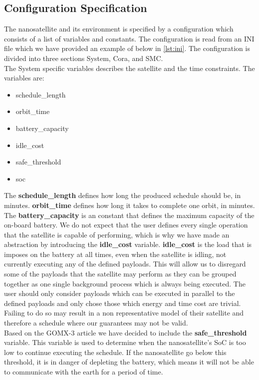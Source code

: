 \subsection{Configuration Specification} \label{subsec:init}
The nanosatellite and its environment is specified by a configuration which consists of a list of variables and constants. The configuration is read from an INI file which we have provided an example of below in \cref{lst:ini}.
The configuration is divided into three sections System, Cora, and SMC.\\
The System specific variables describes the satellite and the time constraints.
The variables are:
\begin{itemize}
	\item schedule\_length
	\item orbit\_time
	\item battery\_capacity
	\item idle\_cost
	\item safe\_threshold
	\item soc
\end{itemize}
The \textbf{schedule\_length} defines how long the produced schedule should be, in minutes. \textbf{orbit\_time} defines how long it takes to complete one orbit, in minutes. The \textbf{battery\_capacity} is an constant that defines the maximum capacity of the on-board battery. We do not expect that the user defines every single operation that the satellite is capable of performing, which is why we have made an abstraction by introducing the \textbf{idle\_cost} variable. 
\textbf{idle\_cost} is the load that is imposes on the battery at all times, even when the satellite is idling, not currently executing any of the defined payloads.
This will allow us to disregard some of the payloads that the satellite may perform as they can be grouped together as one single background process which is always being executed.
The user should only consider payloads which can be executed in parallel to the defined payloads and only chose those which energy and time cost are trivial.
Failing to do so may result in a non representative model of their satellite and therefore a schedule where our guarantees may not be valid.\\
Based on the GOMX-3 article\cite{gomx3} we have decided to include the \textbf{safe\_threshold} variable.
This variable is used to determine when the nanosatellite's SoC is too low to continue executing the schedule.
If the nanosatellite go below this threshold, it is in danger of depleting the battery, which means it will not be able to communicate with the earth for a period of time.
